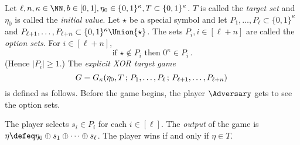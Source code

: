 \begin{definition}
    \label{def:xor-game-explicit}
    \label{def:xor-game-lookahead}
    Let $\ell, n, \kappa \in \NN, b \in [0, 1], \eta_0 \in \{0, 1\}^\kappa, T \subset \{0,1\}^\kappa$. 
    $T$ is called the \emph{target set} and 
    $\eta_0$ is called the \emph{initial value}. 
    Let 
    $\star$ be a special symbol and let 
    $P_1, \ldots, P_\ell \subset \{0, 1\}^\kappa$ and 
    $P_{\ell + 1}, \ldots, P_{\ell + n} \subset \{0,1\}^\kappa \Union \{\star\}$.  
    The sets $P_i, i \in [\ell + n]$ are 
    called the \emph{option sets}. 
    For $i \in [\ell + n]$, 
    \begin{equation}\label{eq:zero-option}
        \text{if $\star \not \in P_i$ then $0^\kappa \in P_i$}\,.
    \end{equation}
    (Hence $|P_i| \geq 1$.)
    The \emph{explicit XOR target game}
    \[
        G = G_{\kappa}(\eta_0, T\,;\, P_1, \ldots, P_\ell \,;\, P_{\ell+1}, \ldots, P_{\ell+n})
        \,
    \]
    is 
    defined 
    as follows. 
    Before the game begins, the player $\Adversary$ gets to see the option sets. 
    \begin{description}[font=\normalfont\itshape\space]
        \item[If $n = 0$.]
        The player selects $s_i \in P_i$ for each $i \in [\ell]$. 
        The \emph{output} of the game is 
        $\eta \defeq \eta_0 \oplus s_1 \oplus \cdots \oplus s_\ell$. 
        The player wins if and only if 
        $\eta \in T$. 



\end{description}
\end{definition}
